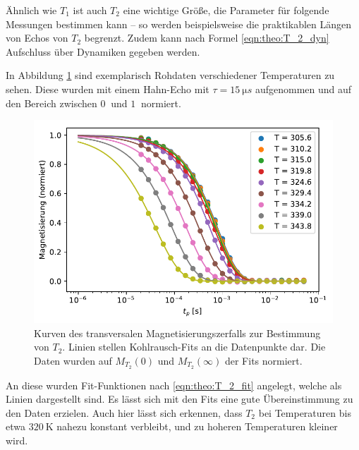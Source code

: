 Ähnlich wie $T_1$ ist auch $T_2$ eine wichtige Größe, die Parameter für folgende Messungen bestimmen kann -- so werden beispielsweise die praktikablen Längen von Echos von $T_2$ begrenzt. Zudem kann nach Formel \eqref{eqn:theo:T_2_dyn} Aufschluss über Dynamiken gegeben werden.

In Abbildung \ref{fig:res:T_2_roh} sind exemplarisch Rohdaten verschiedener Temperaturen zu sehen. Diese wurden mit einem Hahn-Echo mit $\tau = \SI{15}{\micro s}$ aufgenommen und auf den Bereich zwischen $\SI{0}{}$ und $\SI{1}{}$ normiert.
\begin{figure}
	\begin{center}
		\includegraphics[width=.9\textwidth]{graphics/plot/t2_roh2.pdf}
	\end{center}
	\caption{Kurven des transversalen Magnetisierungszerfalls zur Bestimmung von $T_2$. Linien stellen Kohlrausch-Fits an die Datenpunkte dar. Die Daten wurden auf $M_{T_2}(0)$ und $M_{T_2}(\infty)$ der Fits normiert.} \label{fig:res:T_2_roh}
\end{figure}

An diese wurden Fit-Funktionen nach \eqref{eqn:theo:T_2_fit} angelegt, welche als Linien dargestellt sind. Es lässt sich mit den Fits eine gute Übereinstimmung zu den Daten erzielen. Auch hier lässt sich erkennen, dass $T_2$ bei Temperaturen bis etwa $\SI{320}{\kelvin}$ nahezu konstant verbleibt, und zu hoheren Temperaturen kleiner wird.

